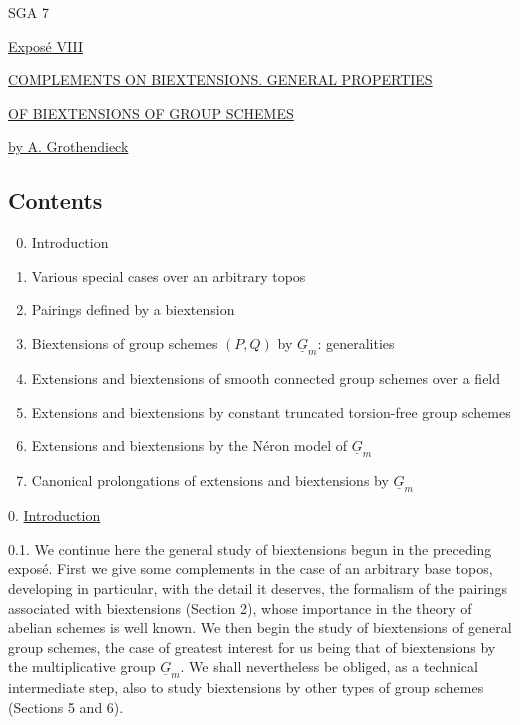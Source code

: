 
\begin{center}
SGA 7

\vspace{1em}
\underline{Expos\'e VIII}

\vspace{1em}
\underline{COMPLEMENTS ON BIEXTENSIONS. GENERAL PROPERTIES}

\underline{OF BIEXTENSIONS OF GROUP SCHEMES}

\vspace{1em}
\underline{by A. Grothendieck}
\end{center}

\subsection*{Contents}

\begin{enumerate}[label=\arabic*.]
\setcounter{enumi}{-1}
\item Introduction
\item Various special cases over an arbitrary topos
\item Pairings defined by a biextension
\item Biextensions of group schemes $(P,Q)$ by $\underline G_m$: generalities
\item Extensions and biextensions of smooth connected group schemes over a field
\item Extensions and biextensions by constant truncated torsion-free group schemes
\item Extensions and biextensions by the N\'eron model of $\underline G_m$
\item Canonical prolongations of extensions and biextensions by $\underline G_m$
\end{enumerate}

0. \underline{Introduction}

0.1. We continue here the general study of biextensions begun in the
preceding expos\'e.  First we give some complements in the case of an
arbitrary base topos, developing in particular, with the detail it
deserves, the formalism of the pairings associated with biextensions
(Section 2), whose importance in the theory of abelian schemes is well
known.  We then begin the study of biextensions of general group
schemes, the case of greatest interest for us being that of
biextensions by the multiplicative group $\underline G_m$.  We shall
nevertheless be obliged, as a technical intermediate step, also to
study biextensions by other types of group schemes (Sections 5 and 6).

